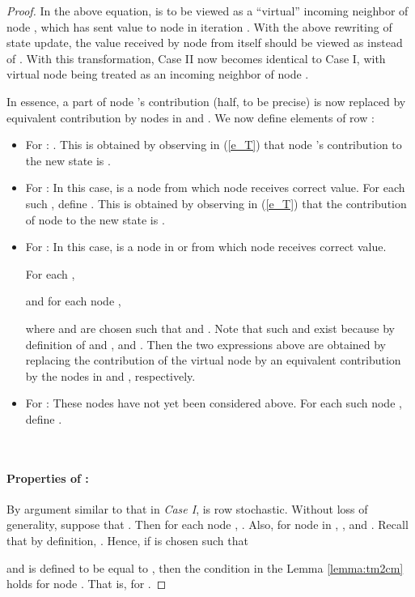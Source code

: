 \documentclass{llncs}
\begin{document}
\begin{proof}
In the above equation,  is to be viewed as a ``virtual'' incoming
neighbor of node , which has sent value 
to node  in iteration .
With the above rewriting of state update,
the value received by node  from itself should
be viewed as  instead of . 
With this transformation, Case II now becomes identical
to Case I, with virtual node  being treated
as an incoming neighbor of node .


In essence, a part of node 's contribution (half, to be precise) is now replaced by equivalent contribution by nodes in  and . 
We now define elements  of row :

\begin{itemize}
\item For : . This is obtained by observing in (\ref{e_T}) that node 's contribution to the new state  is .


\item For  : In this case,  is a node from which node  receives correct value. For each such , define . This is obtained by observing in (\ref{e_T}) that the contribution of node  to the new state  is .


\item For  : In this case,  is a node in  or   from which node  receives correct value. 

For each ,

and for each node ,


where  and  are chosen such that  and . Note that such  and  exist because by definition of  and ,  and . Then the two expressions above are obtained by replacing the contribution of the virtual node  by an equivalent contribution by the nodes in  and , respectively.

\item For  :
 These nodes have not yet been considered above.
For each such node , define .
\end{itemize}

~

\paragraph{Properties of :}


By argument similar to that in {\em Case I},  is row stochastic. Without loss of generality, suppose that . Then for each node , . Also, for node  in , , and . Recall that by definition, . Hence, if  is chosen such that 


and  is defined to be equal to , then the condition in the Lemma \ref{lemma:tm2cm} holds for node . That is,
 for . 


\end{proof}
\end{document}
